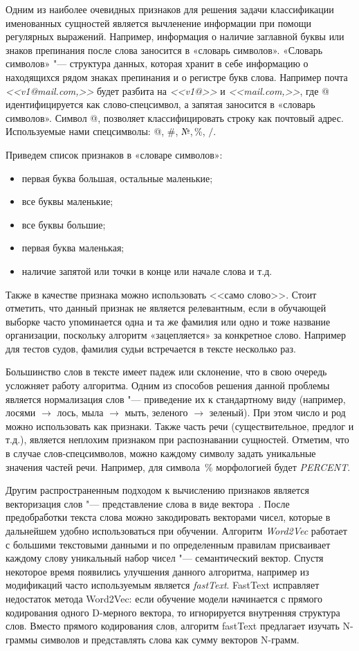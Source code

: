 \documentclass{csmathnotes}
\begin{document}
Одним из наиболее очевидных признаков для решения задачи классификации именованных сущностей является вычленение информации при помощи регулярных выражений. Например, информация о наличие заглавной буквы или знаков препинания после слова заносится в  «словарь символов». «Словарь символов» "--- структура данных, которая хранит в себе информацию о находящихся рядом знаках препинания и о регистре букв слова.
Например почта \emph{<<v1@mail.com,>>} будет разбита на \emph{<<v1@>>} и \emph{<<mail.com,>>}, где @ идентифицируется как слово-спецсимвол, а запятая заносится в «словарь символов». Символ @, позволяет классифицировать строку как почтовый адрес. Используемые нами спецсимволы: @, \#, №,\,\%, $/$.


Приведем список признаков в «словаре символов»:
\begin{itemize}
    \item первая буква большая, остальные маленькие;
    \item все буквы маленькие;
    \item все буквы большие;
    \item первая буква маленькая;
    \item наличие запятой или точки в конце или начале слова и т.д.
\end{itemize}


Также в качестве признака можно использовать <<само слово>>. Стоит отметить, что данный признак не является релевантным, если в обучающей выборке часто упоминается одна и та же фамилия или одно и тоже название организации, поскольку алгоритм «зацепляется» за конкретное слово.
Например для тестов судов, фамилия судьи встречается в тексте несколько раз.


Большинство слов в тексте имеет падеж или склонение, что в свою очередь усложняет работу алгоритма.
Одним из способов решения данной проблемы является нормализация слов "--- приведение их к стандартному виду
(например, лосями $\rightarrow$  лось, мыла $\rightarrow$ мыть, зеленого $\rightarrow$ зеленый).
При этом число и род можно использовать как признаки.
Также часть речи (существительное, предлог и т.д.), является неплохим признаком при распознавании сущностей.
Отметим, что в случае слов-спецсимволов, можно каждому символу задать уникальные значения частей речи.
Например, для символа \,\% морфологией будет \emph{PERCENT}.

 
Другим распространенным подходом к вычислению признаков является векторизация слов "---  представление слова в виде вектора~\cite{w2v}.
После предобработки текста слова можно закодировать векторами чисел, которые в дальнейшем удобно использоваться при обучении.
Алгоритм \emph{Word2Vec} работает с большими текстовыми данными и по определенным правилам присваивает каждому слову уникальный набор чисел "--- семантический вектор. Спустя некоторое время появились улучшения данного алгоритма, например  из модификаций часто используемым является \emph{fastText}. FastText исправляет недостаток метода Word2Vec: если обучение модели начинается с прямого кодирования одного D-мерного вектора, то игнорируется внутренняя структура слов. Вместо прямого кодирования слов, алгоритм fastText предлагает изучать N-граммы символов и представлять слова как сумму векторов N-грамм.
\end{document}
